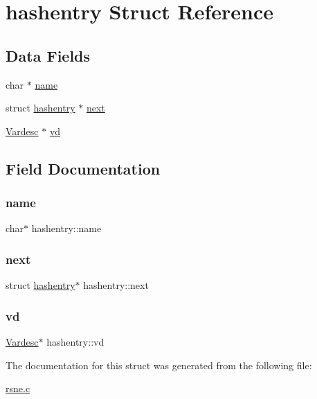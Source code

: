 \hypertarget{structhashentry}{}\section{hashentry Struct Reference}
\label{structhashentry}
\subsection*{Data Fields}
\begin{DoxyCompactItemize}
\item 
char $\ast$ \hyperlink{structhashentry_a2955418140a4f9e4d3baf41c40f0721e}{name}
\item 
struct \hyperlink{structhashentry}{hashentry} $\ast$ \hyperlink{structhashentry_a8693ccd89d78cd057c0efb49d7485e9e}{next}
\item 
\hyperlink{struct_vardesc}{Vardesc} $\ast$ \hyperlink{structhashentry_a587952ae5699882a3dc92e9a0234a452}{vd}
\end{DoxyCompactItemize}


\subsection{Field Documentation}
\mbox{\label{structhashentry_a2955418140a4f9e4d3baf41c40f0721e}} 
\subsubsection{\texorpdfstring{name}{name}}
{\footnotesize\ttfamily char$\ast$ hashentry\+::name}

\mbox{\label{structhashentry_a8693ccd89d78cd057c0efb49d7485e9e}} 
\subsubsection{\texorpdfstring{next}{next}}
{\footnotesize\ttfamily struct \hyperlink{structhashentry}{hashentry}$\ast$ hashentry\+::next}

\mbox{\label{structhashentry_a587952ae5699882a3dc92e9a0234a452}} 
\subsubsection{\texorpdfstring{vd}{vd}}
{\footnotesize\ttfamily \hyperlink{struct_vardesc}{Vardesc}$\ast$ hashentry\+::vd}



The documentation for this struct was generated from the following file\+:\begin{DoxyCompactItemize}
\item 
\hyperlink{rsne_8c}{rsne.\+c}\end{DoxyCompactItemize}
